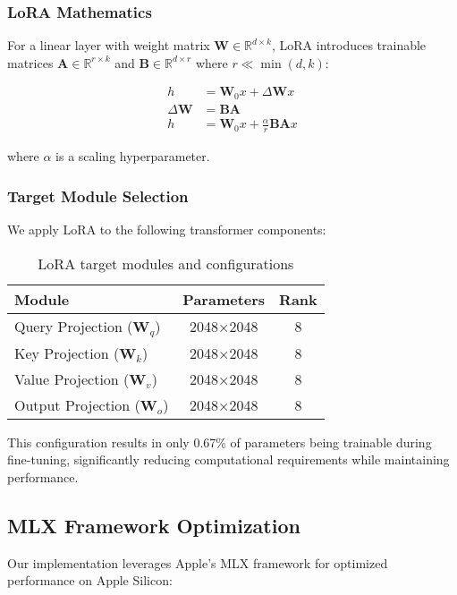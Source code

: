 \subsubsection{LoRA Mathematics}

For a linear layer with weight matrix $\mathbf{W} \in \mathbb{R}^{d \times k}$, LoRA introduces trainable matrices $\mathbf{A} \in \mathbb{R}^{r \times k}$ and $\mathbf{B} \in \mathbb{R}^{d \times r}$ where $r \ll \min(d,k)$:

\begin{align}
h &= \mathbf{W}_0 x + \Delta \mathbf{W} x \\
\Delta \mathbf{W} &= \mathbf{B}\mathbf{A} \\
h &= \mathbf{W}_0 x + \frac{\alpha}{r} \mathbf{B}\mathbf{A} x
\end{align}

where $\alpha$ is a scaling hyperparameter.

\subsubsection{Target Module Selection}

We apply LoRA to the following transformer components:

\begin{table}[H]
\centering
\begin{tabular}{lcc}
\toprule
Module & Parameters & Rank \\
\midrule
Query Projection ($\mathbf{W}_q$) & 2048×2048 & 8 \\
Key Projection ($\mathbf{W}_k$) & 2048×2048 & 8 \\
Value Projection ($\mathbf{W}_v$) & 2048×2048 & 8 \\
Output Projection ($\mathbf{W}_o$) & 2048×2048 & 8 \\
\bottomrule
\end{tabular}
\caption{LoRA target modules and configurations}
\label{tab:lora-modules}
\end{table}

This configuration results in only 0.67\% of parameters being trainable during fine-tuning, significantly reducing computational requirements while maintaining performance.

\subsection{MLX Framework Optimization}

Our implementation leverages Apple's MLX framework for optimized performance on Apple Silicon:

